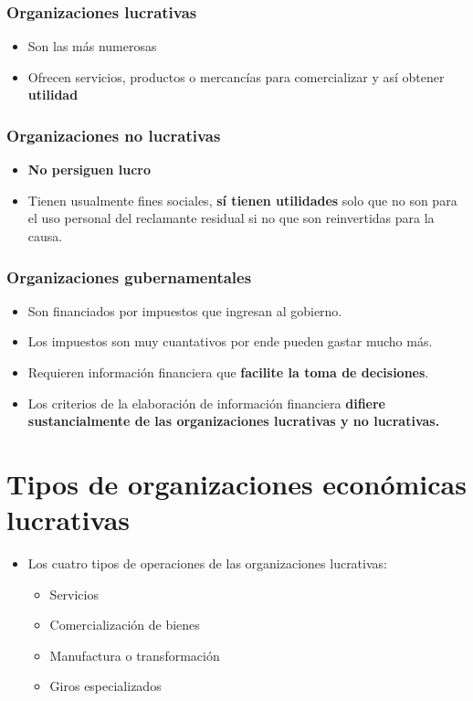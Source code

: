 \documentclass{article}
\begin{document}
\subsubsection{Organizaciones lucrativas}
\begin{itemize}
    \small
    \item Son las más numerosas
    \item Ofrecen servicios, productos o mercancías para comercializar y así obtener \textbf{utilidad}
\end{itemize}

\subsubsection{Organizaciones no lucrativas}
\begin{itemize}
    \small
    \item \textbf{No persiguen lucro}
    \item Tienen usualmente fines sociales, \textbf{sí tienen utilidades} solo que no son para el uso personal del reclamante residual si no que son reinvertidas para la causa.
\end{itemize}

\subsubsection{Organizaciones gubernamentales}
\begin{itemize}
    \small
    \item Son financiados por impuestos que ingresan al gobierno.
    \item Los impuestos son muy cuantativos por ende pueden gastar mucho más.
    \item Requieren información financiera que \textbf{facilite la toma de decisiones}.
    \item Los criterios de la elaboración de información financiera \textbf{difiere sustancialmente de las organizaciones lucrativas y no lucrativas.}
\end{itemize}

\section{Tipos de organizaciones económicas lucrativas}
\begin{itemize}
    \item Los cuatro tipos de operaciones de las organizaciones lucrativas:
    \begin{itemize}
        \item Servicios
        \item Comercialización de bienes    
        \item Manufactura o transformación
        \item Giros especializados
    \end{itemize}
\end{itemize}
\end{document}
